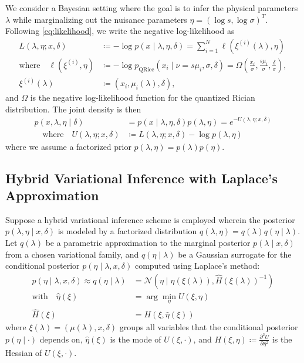 \documentclass{article}
\begin{document}
We consider a Bayesian setting where the goal is to infer the physical parameters $\lambda$ while marginalizing out the nuisance parameters $\eta = (\log s, \log \sigma)^T$.
Following \cref{eq:likelihood}, we write the negative log-likelihood as
%
\begin{align}\label{eq:negative-log-likelihood}
  L(\lambda, \eta; x, \delta)              & \coloneqq -\log p(x \mid \lambda, \eta, \delta) = \sum_{i=1}^N \ell(\xi^{(i)}(\lambda), \eta)                                                                      \\
  \text{where} \quad \ell(\xi^{(i)}, \eta) & \coloneqq -\log p_{\mathrm{QRice}}(x_i \mid \nu = s \mu_i, \sigma, \delta) = \Omega\left(\frac{x_i}{\sigma}, \frac{s \mu_i}{\sigma}, \frac{\delta}{\sigma}\right), \\
  \xi^{(i)}(\lambda)                       & \coloneqq (x_i, \mu_i(\lambda), \delta),
\end{align}
%
and $\Omega$ is the negative log-likelihood function for the quantized Rician distribution.
The joint density is then
%
\begin{align}
  p(x, \lambda, \eta \mid \delta) & = p(x \mid \lambda, \eta, \delta) p(\lambda, \eta) = e^{-U(\lambda, \eta; x, \delta)} \\
  \quad \text{where} \quad
  U(\lambda, \eta; x, \delta)     & \coloneqq L(\lambda, \eta; x, \delta) - \log p(\lambda, \eta)
\end{align}
%
where we assume a factorized prior $p(\lambda, \eta) = p(\lambda) p(\eta)$.

\subsection{Hybrid Variational Inference with Laplace's Approximation}

Suppose a hybrid variational inference scheme is employed wherein the posterior $p(\lambda, \eta \mid x, \delta)$ is modeled by a factorized distribution $q(\lambda, \eta) = q(\lambda) q(\eta \mid \lambda)$.
Let $q(\lambda)$ be a parametric approximation to the marginal posterior $p(\lambda \mid x, \delta)$ from a chosen variational family, and $q(\eta \mid \lambda)$ be a Gaussian surrogate for the conditional posterior $p(\eta \mid \lambda, x, \delta)$ computed using Laplace's method:
%
\begin{align}
  p(\eta \mid \lambda, x, \delta) \approx q(\eta \mid \lambda) & = \mathcal{N}(\eta \mid \hat{\eta}(\xi(\lambda)), \hat{H}(\xi(\lambda))^{-1}) \\
  \text{with} \quad
  \hat{\eta}(\xi)                                              & = \arg\min_{\eta} U(\xi, \eta) \label{eq:laplace-mode}                        \\
  \hat{H}(\xi)                                                 & = H(\xi, \hat{\eta}(\xi)) \label{eq:laplace-hessian}
\end{align}
%
where $\xi(\lambda) = (\mu(\lambda), x, \delta)$ groups all variables that the conditional posterior $p(\eta \mid \cdot)$ depends on, $\hat{\eta}(\xi)$ is the mode of $U(\xi, \cdot)$, and $H(\xi, \eta) \coloneqq \frac{\partial^2 U}{\partial \eta^2}$ is the Hessian of $U(\xi, \cdot)$.
\end{document}
